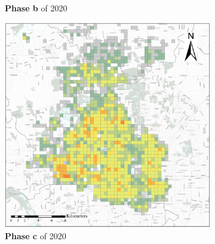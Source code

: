 \documentclass[preprints,article,accept,moreauthors,pdftex]{Definitions/mdpi}
\begin{document}
\begin{figure}[ht]
\begin{subfigure}{.28\textwidth}
        \caption{\textbf{Phase b} of 2020}\label{fig:p_b_2020}
    \end{subfigure}
    \begin{subfigure}{.28\textwidth}
        \includegraphics[width=\textwidth]{Figures/BSSPhase3_2020.eps}
        \caption{\textbf{Phase c} of 2020}\label{fig:p_c_2020}
    \end{subfigure}
    \begin{subfigure}{.14\textwidth}

\end{subfigure}
\end{figure}
\end{document}
